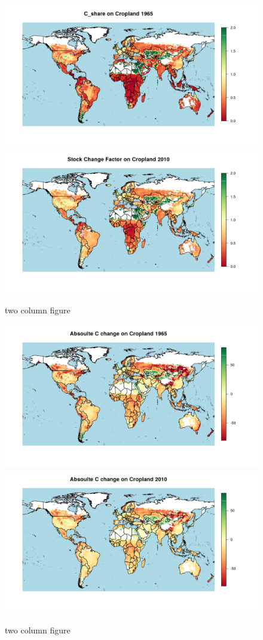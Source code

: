 \documentclass[gc, manuscript]{copernicus}
\begin{document}
\begin{figure}
\includegraphics[width=12cm]{images/maps/CShare_1965} \includegraphics[width=12cm]{images/maps/CShare_2010} \caption{two column figure}\label{fig:unnamed-chunk-10}
\end{figure}

\begin{figure}
\includegraphics[width=12cm]{images/maps/CIncrease_1965} \includegraphics[width=12cm]{images/maps/CIncrease_2010} \caption{two column figure}\label{fig:unnamed-chunk-11}
\end{figure}
\end{document}
